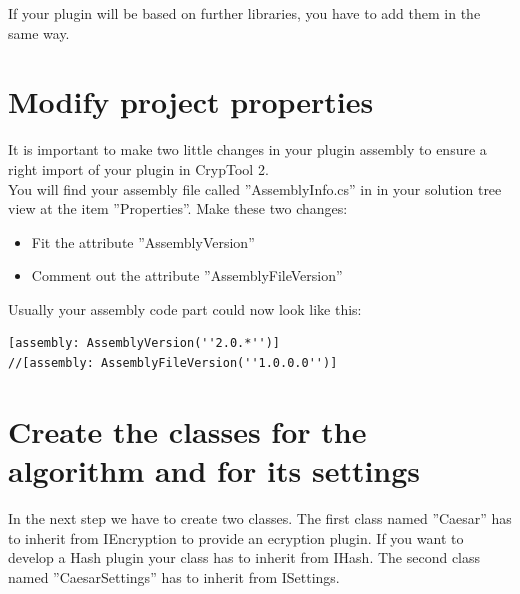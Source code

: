 If your plugin will be based on further libraries, you have to add them in the same way.
\section{Modify project properties}\label{sec:ModifyProjectProperties}
It is important to make two little changes in your plugin assembly to ensure a right import of your plugin in CrypTool 2.\\
You will find your assembly file called ''AssemblyInfo.cs'' in in your solution tree view at the item ''Properties''. Make these two changes:
\begin{itemize}
	\item Fit the attribute ''AssemblyVersion''
	\item Comment out the attribute ''AssemblyFileVersion''
\end{itemize}
Usually your assembly code part could now look like this:
\begin{lstlisting}
[assembly: AssemblyVersion(''2.0.*'')]
//[assembly: AssemblyFileVersion(''1.0.0.0'')]
\end{lstlisting}
\section{Create the classes for the algorithm and for its settings}\label{sec:CreateTheClassesForTheAlgorithmAndForItsSettings}
In the next step we have to create two classes. The first class named ''Caesar'' has to inherit from IEncryption to provide an ecryption plugin. If you want to develop a Hash plugin your class has to inherit from IHash.
The second class named ''CaesarSettings'' has to inherit from ISettings.
